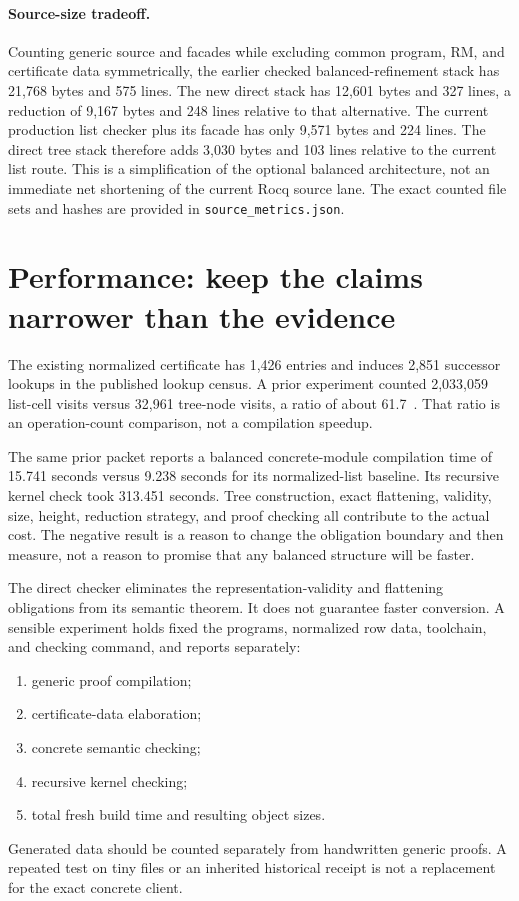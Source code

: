 \documentclass[11pt]{article}
\theoremstyle{remark}\newtheorem{remark}[theorem]{Remark}
\newcommand{\code}[1]{\texttt{\small #1}}
\begin{document}
\paragraph{Source-size tradeoff.}
Counting generic source and facades while excluding common program, RM, and certificate data symmetrically, the earlier checked balanced-refinement stack has 21,768 bytes and 575 lines. The new direct stack has 12,601 bytes and 327 lines, a reduction of 9,167 bytes and 248 lines relative to that alternative. The current production list checker plus its facade has only 9,571 bytes and 224 lines. The direct tree stack therefore adds 3,030 bytes and 103 lines relative to the current list route. This is a simplification of the optional balanced architecture, not an immediate net shortening of the current Rocq source lane. The exact counted file sets and hashes are provided in \code{source\_metrics.json}.

\section{Performance: keep the claims narrower than the evidence}

The existing normalized certificate has 1,426 entries and induces 2,851 successor lookups in the published lookup census. A prior experiment counted 2,033,059 list-cell visits versus 32,961 tree-node visits, a ratio of about 61.7~\cite{balancedprior}. That ratio is an operation-count comparison, not a compilation speedup.

The same prior packet reports a balanced concrete-module compilation time of 15.741 seconds versus 9.238 seconds for its normalized-list baseline. Its recursive kernel check took 313.451 seconds. Tree construction, exact flattening, validity, size, height, reduction strategy, and proof checking all contribute to the actual cost. The negative result is a reason to change the obligation boundary and then measure, not a reason to promise that any balanced structure will be faster.

The direct checker eliminates the representation-validity and flattening obligations from its semantic theorem. It does not guarantee faster conversion. A sensible experiment holds fixed the programs, normalized row data, toolchain, and checking command, and reports separately:
\begin{enumerate}
\item generic proof compilation;
\item certificate-data elaboration;
\item concrete semantic checking;
\item recursive kernel checking;
\item total fresh build time and resulting object sizes.
\end{enumerate}
Generated data should be counted separately from handwritten generic proofs. A repeated test on tiny files or an inherited historical receipt is not a replacement for the exact concrete client.
\end{document}

